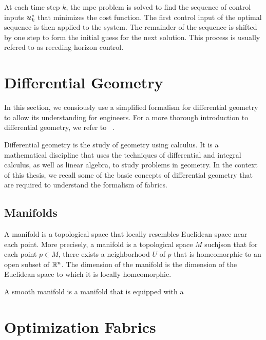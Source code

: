 At each time step $k$, the \ac{mpc} problem is solved to
find the sequence of control inputs $\bm{u}_k^*$ that minimizes
the cost function. The first control input of the optimal
sequence is then applied to the system. The remainder of the
sequence is shifted by one step to form the initial guess
for the next solution. This process is usually refered to as
receding horizon control.

\section{Differential Geometry} %
\label{sec:differential_geometry}

In this section, we consiously use a simplified formalism
for differential geometry to allow its understanding for
engineers. For a more thorough introduction to differential
geometry, we refer to ~\cite{bullo2019geometric}.

Differential geometry is the study of geometry using calculus.
It is a mathematical discipline that uses the techniques of
differential and integral calculus, as well as linear
algebra, to study problems in geometry. In the context of
this thesis, we recall some of the basic concepts of
differential geometry that are required to understand the
formalism of \ac{fabrics}.

\subsection{Manifolds} %
\label{sub:manifolds}

A manifold is a topological space that locally resembles
Euclidean space near each point. More precisely, a manifold
is a topological space $M$ suchjson that for each point $p\in
M$, there exists a neighborhood $U$ of $p$ that is
homeomorphic to an open subset of $\mathbb{R}^n$. The dimension of
the manifold is the dimension of the Euclidean space to
which it is locally homeomorphic.

A smooth manifold is a manifold that is equipped with a





\section{Optimization Fabrics} %
\label{sec:optimization_fabrics}

